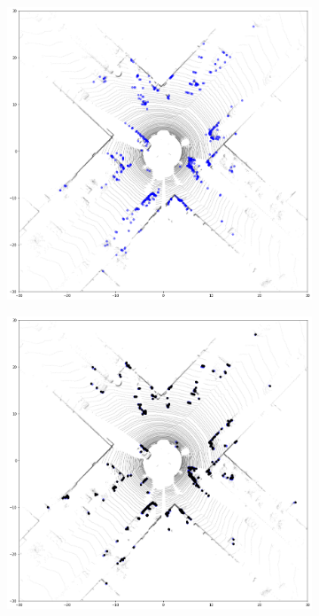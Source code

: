 \documentclass[sigconf]{acmart}
\begin{document}
\begin{figure}[t!]
\setlength{\belowcaptionskip}{-0.1cm} 
     \centering
     \begin{subfigure}[t]{0.25\textwidth}
         \centering
         \includegraphics[width=\textwidth]{Figures/matching1.png}
         \caption{}
         \label{fig:matching a}
     \end{subfigure}
     \begin{subfigure}[t]{0.25\textwidth}
         \centering
         \includegraphics[width=\textwidth]{Figures/matching2.png}
         \caption{}
         \label{fig:matching b}
     \end{subfigure}
     

\end{figure}
\end{document}
